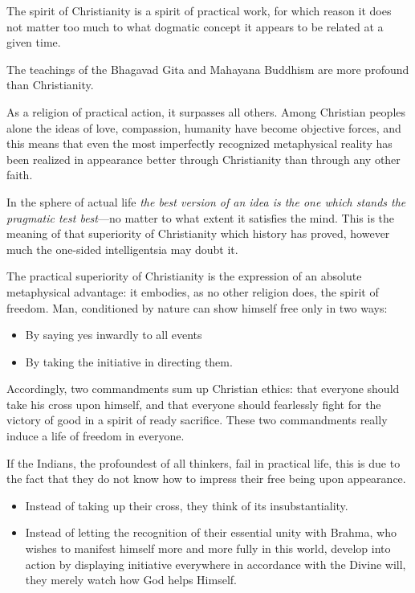 \begin{quotationx}
The spirit of Christianity is a spirit of practical work, for which reason it does not matter too much to what dogmatic concept it appears to be related at a given time.

The teachings of the Bhagavad Gita and Mahayana Buddhism are more profound than Christianity.

As a religion of practical action, it surpasses all others. Among Christian peoples alone the ideas of love, compassion, humanity have become objective forces, and this means that even the most imperfectly recognized metaphysical reality has been realized in appearance better through Christianity than through any other faith.

In the sphere of actual life \emph{the best version of an idea is the one which stands the pragmatic test best}---no matter to what extent it satisfies the mind. This is the meaning of that superiority of Christianity which history has proved, however much the one-sided intelligentsia may doubt it.

The practical superiority of Christianity is the expression of an absolute metaphysical advantage: it embodies, as no other religion does, the spirit of freedom. Man, conditioned by nature can show himself free only in two ways:

\begin{itemize}


\item By saying yes inwardly to all events

\item By taking the initiative in directing them.
\end{itemize}

Accordingly, two commandments sum up Christian ethics: that everyone should take his cross upon himself, and that everyone should fearlessly fight for the victory of good in a spirit of ready sacrifice. These two commandments really induce a life of freedom in everyone.

If the Indians, the profoundest of all thinkers, fail in practical life, this is due to the fact that they do not know how to impress their free being upon appearance.

\begin{itemize}


\item Instead of taking up their cross, they think of its insubstantiality.

\item Instead of letting the recognition of their essential unity with Brahma, who wishes to manifest himself more and more fully in this world, develop into action by displaying initiative everywhere in accordance with the Divine will, they merely watch how God helps Himself.
\end{itemize}
\end{quotationx}



